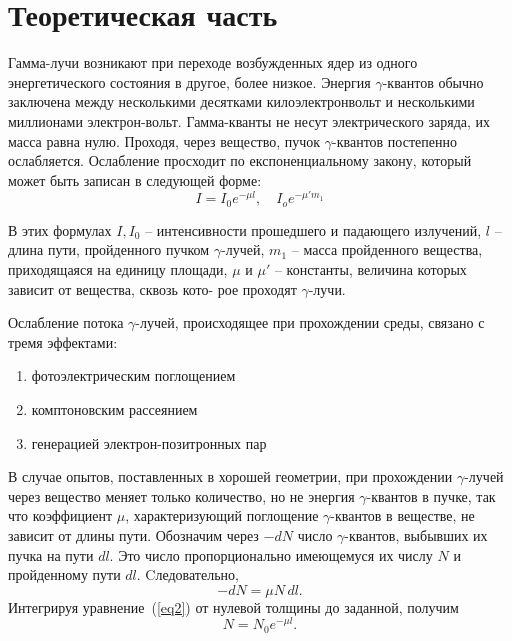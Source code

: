 


    

    \section*{Теоретическая часть}

    Гамма-лучи возникают при переходе возбужденных ядер из одного энергетического состояния в другое, более низкое. Энергия $\gamma$-квантов обычно заключена между несколькими десятками килоэлектронвольт и несколькими миллионами электрон-вольт. Гамма-кванты не несут электрического заряда, их масса равна нулю. Проходя, через вещество, пучок $\gamma$-квантов постепенно ослабляется. Ослабление просходит по експоненциальному закону, который может быть записан в следующей форме:
	\begin{equation}
		\label{eq1}
		I = I_0 e^{-\mu l}, \quad I_o e^{-\mu 'm_1} 
	\end{equation}

	В этих формулах $I, I_0$ -- интенсивности прошедшего и падающего излучений, $l$ -- длина пути, пройденного пучком $\gamma$-лучей, $m_1$ --
	масса пройденного вещества, приходящаяся на единицу площади, $\mu$ и
	$ \mu' $ -- константы, величина которых зависит от вещества, сквозь кото-
	рое проходят $\gamma$-лучи.
	
	Ослабление потока $\gamma$-лучей, происходящее при прохождении среды, связано с тремя эффектами: 
    
    \begin{enumerate}
        \item фотоэлектрическим поглощением
        \item комптоновским рассеянием
        \item генерацией электрон-позитронных пар
    \end{enumerate}
	
	В случае опытов, поставленных в хорошей геометрии, при прохождении $\gamma$-лучей через вещество меняет только количество, но не энергия $\gamma$-квантов в пучке, так что коэффициент $\mu$, характеризующий поглощение $\gamma$-квантов в веществе, не зависит от длины пути. Обозначим через $-dN$ число $\gamma$-квантов, выбывших их пучка на пути $dl$. Это число пропорционально имеющемуся их числу $N$ и пройденному пути $dl$. Cледовательно,
	\begin{equation}
		\label{eq2}
		-dN = \mu N \, dl.
	\end{equation} 
	Интегрируя уравнение~(\ref{eq2}) от нулевой толщины до заданной, получим
	\begin{equation}
		\label{eq3}
		N = N_0 e^{-\mu l}.
	\end{equation}


